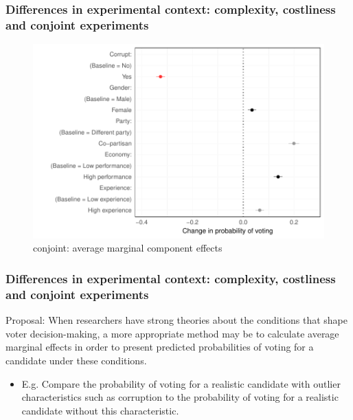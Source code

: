 \documentclass[usenames,dvipsnames]{beamer}
\begin{document}
\begin{frame}
\frametitle{Differences in experimental context: complexity, costliness and conjoint experiments}

\begin{figure}[!hb]
\hspace*{-11mm}
\includegraphics[scale = 0.7]{../figs/b_amce.pdf}
\caption{\citet{breitenstein2019choosing} conjoint: average marginal component effects}
\small
\vspace{-0.5cm}
\label{fig: b_amce}
\end{figure}

\end{frame}

\begin{frame}[label=conjoint]
\frametitle{Differences in experimental context: complexity, costliness and conjoint experiments}

\textcolor{Cerulean}{Proposal}: When researchers have strong theories about the \textcolor{Cerulean}{conditions that shape voter decision-making}, a more appropriate method may be to calculate average marginal effects in order to present predicted probabilities of voting for a candidate under these conditions.
\begin{itemize}
\item E.g. Compare the probability of voting for a \textcolor{Cerulean}{realistic candidate} with outlier characteristics such as corruption to the probability of voting for a realistic candidate without this characteristic. \hyperlink{b_conjoint}{}  \hyperlink{fz_conjoint1}{} \hyperlink{fz_conjoint1}{}
\end{itemize}

\end{frame}
\end{document}
